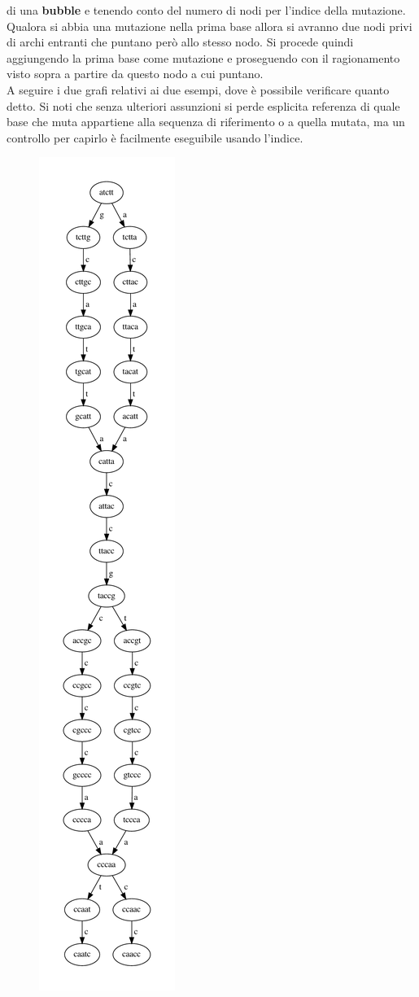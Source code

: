 \documentclass[a4paper,12pt, oneside]{book}
\begin{document}
di una \textbf{bubble} e tenendo conto del numero di nodi per l'indice della
mutazione. \\
Qualora si abbia una mutazione nella prima base allora si avranno due
nodi privi di archi entranti che puntano però allo stesso nodo. Si procede
quindi aggiungendo la prima base come mutazione e proseguendo con il
ragionamento visto sopra a partire da questo nodo a cui puntano.\\
A seguire i due grafi relativi ai due esempi, dove è possibile verificare quanto
detto. Si noti che senza ulteriori assunzioni si perde esplicita referenza di
quale base che muta appartiene alla sequenza di riferimento o a quella mutata,
ma un controllo per capirlo è facilmente eseguibile usando l'indice.
\begin{figure}[H]
  \centering
  \includegraphics[scale = 0.33]{img/mut.pdf}

\end{figure}
\end{document}
